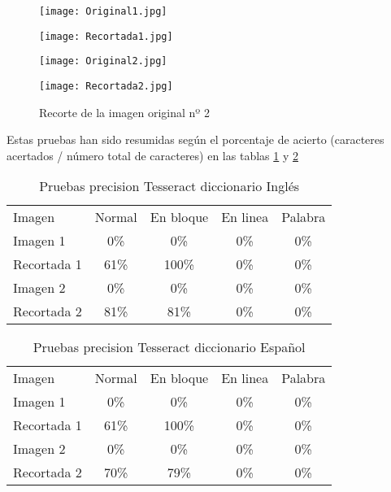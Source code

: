 \begin{figure}[ht]
		\centering
		\begin{minipage}[b]{0.45\linewidth}
			\texttt{[image: Original1.jpg]}
			\caption{Imagen Original nº 1}
			\label{fig:original1}
	\end{minipage}
	\quad
	\begin{minipage}[b]{0.45\linewidth}
		\texttt{[image: Recortada1.jpg]}
		\caption{Recorte de la imagen original nº 1}
		\label{fig:recortada1}
		\end{minipage}
		\begin{minipage}[b]{0.45\linewidth}
			\texttt{[image: Original2.jpg]}
			\caption{Imagen Original nº 2}
			\label{fig:original2}
	\end{minipage}
	\quad
	\begin{minipage}[b]{0.45\linewidth}
		\texttt{[image: Recortada2.jpg]}
		\caption{Recorte de la imagen original nº 2}
		\label{fig:recortada2}
		\end{minipage}
	\end{figure}
	


\clearpage

Estas pruebas han sido resumidas según el porcentaje de acierto (caracteres acertados / número total de caracteres) en las tablas \ref{tesseractingles} y \ref{tesseractespa}


\begin{table}[ht]
\center
\begin{tabular}{l c c c c}
\toprule
    Imagen    & Normal        & En bloque & En linea & Palabra\\
    \otoprule
Imagen 1     &  0\%   &  0\%     & 0\%   &  0\%\\
Recortada 1  &    61\%&   100\%   & 0\%  & 0\%\\
Imagen 2     &     0\%    &    0\%   &  0\%  &  0\%\\
Recortada 2      &    81\%&   81\%   & 0\%  & 0\%\\
\bottomrule 
\end{tabular}
\label{tesseractingles}
\caption{Pruebas precision Tesseract diccionario Inglés}
\end{table}

\begin{table}[ht]
\center
\begin{tabular}{l c c c c}
\toprule
    Imagen    & Normal        & En bloque & En linea & Palabra\\
    \otoprule
Imagen 1     &  0\%   &  0\%     & 0\%   &  0\%\\
Recortada 1  &    61\%&   100\%   & 0\%  & 0\%\\
Imagen 2     &     0\%    &    0\%   &  0\%  &  0\%\\
Recortada 2      &    70\%&   79\%   & 0\%  & 0\%\\
\bottomrule 
\end{tabular}
\label{tesseractespa}
\caption{Pruebas precision Tesseract diccionario Español}
\end{table}

